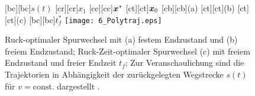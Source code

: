\begin{figure}[h]
\centering
	[bc][bc]{$s(t)$}
	[cr][cr]{$x_1$}
	[cc][cc]{$\boldsymbol{x}^\ast$}
	[ct][ct]{$\boldsymbol{x}_0$}
	[cb][cb]{\scriptsize (a)}
	[ct][ct]{\scriptsize (b)}
	[ct][ct]{\scriptsize (c)}
	[bc][bc]{$t_f^\ast$}
	\centering
  	\texttt{[image: 6\_Polytraj.eps]}
  \caption[Ruck-optimaler Spurwechsel]{Ruck-optimaler Spurwechsel mit (a) festem Endzustand und (b) freiem Endzustand; Ruck-Zeit-optimaler Spurwechsel (c) mit freiem Endzustand und freier Endzeit $t_f$; Zur Veranschaulichung sind die Trajektorien in Abhängigkeit der zurückgelegten Wegstrecke $s(t)$ für $v=\text{const.}$ dargestellt .}
    \label{fig:polytraj}
\end{figure}

